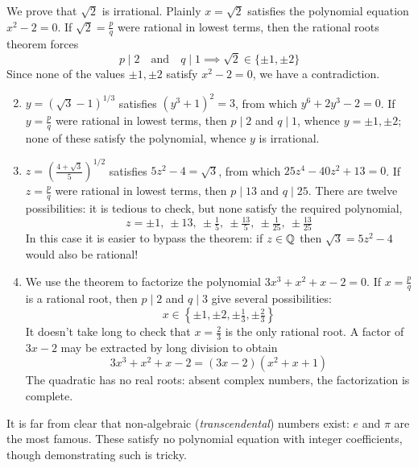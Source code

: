 \begin{examples}{}{}
	\exstart We prove that $\sqrt 2$ is irrational.	Plainly $x=\sqrt 2$ satisfies the polynomial equation $x^2-2=0$. If $\sqrt 2=\frac pq$ were rational in lowest terms, then the rational roots theorem forces
	\[
		p\mid 2\quad\text{and}\quad q\mid 1\implies \sqrt 2\in\{\pm 1,\pm 2\}
	\]
	Since none of the values $\pm 1,\pm 2$ satisfy $x^2-2=0$, we have a contradiction.

	\begin{enumerate}\setcounter{enumi}{1}
		\item $y=(\sqrt 3-1)^{1/3}$ satisfies $(y^3+1)^2=3$, from which $y^6+2y^3-2=0$. If $y=\frac pq$ were rational in lowest terms, then $p\mid 2$ and $q\mid 1$, whence $y=\pm 1,\pm 2$; none of these satisfy the polynomial, whence $y$ is irrational.
		
		\item $z=\left(\frac{4+\sqrt 3}{5}\right)^{1/2}$ satisfies $5z^2-4=\sqrt 3$, from which $25z^4-40z^2+13=0$. If $z=\frac pq$ were rational in lowest terms, then $p\mid 13$ and $q\mid 25$. There are twelve possibilities: it is tedious to check, but none satisfy the required polynomial,
		\[
			z=\pm 1,\ \pm 13,\ \pm\tfrac 15,\ \pm\tfrac{13}5,\ \pm\tfrac 1{25},\ \pm\tfrac{13}{25}
		\]
		In this case it is easier to bypass the theorem: if $z\in\mathbb{Q}$ then $\sqrt 3=5z^2-4$ would also be rational!
		
		\item We use the theorem to factorize the polynomial $3x^3+x^2+x-2=0$. If $x=\frac pq$ is a rational root, then $p\mid 2$ and $q\mid 3$ give several possibilities:
		\[
			x\in\left\{\pm 1,\pm 2,\pm\tfrac 13,\pm\tfrac 23\right\}
		\]
		It doesn't take long to check that $x=\frac 23$ is the only rational root. A factor of $3x-2$ may be extracted by long division to obtain
		\[
			3x^3+x^2+x-2=(3x-2)(x^2+x+1)
		\]
		The quadratic has no real roots: absent complex numbers, the factorization is complete.
	\end{enumerate}
\end{examples}

It is far from clear that non-algebraic (\emph{transcendental}) numbers exist: $e$ and $\pi$ are the most famous. These satisfy no polynomial equation with integer coefficients, though demonstrating such is tricky.


